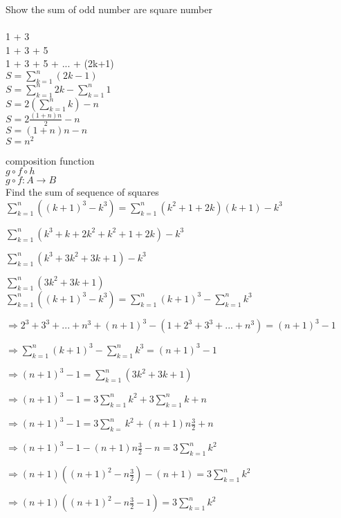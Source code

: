 \documentclass[10pt]{article}
\begin{document}
\begin{flushleft}
Show the sum of odd number are square number\\
\\
1 + 3\\
1 + 3 + 5 \\
1 + 3 + 5 + ... + (2k+1) \\
\medskip
$S = \sum_{k=1}^{n} (2k-1)$ \\
$S = \sum_{k=1}^{n} 2k - \sum_{k=1}^{n} 1$ \\
$S = 2(\sum_{k=1}^{n} k) - n $ \\
$S = 2 \frac{(1+n)n}{2} - n$ \\
$S = (1+n)n - n$ \\
$S = n^2 $ \\
\end{flushleft}
composition function \\
$g \circ f \circ h $ \\
$g \circ f \colon A\to B$ \\

Find the sum of sequence of squares\\

$\sum_{k=1}^{n}((k+1)^3 - k^3) = \sum_{k=1}^{n}(k^2+1+2k)(k+1) - k^3$

$\sum_{k=1}^{n} (k^3+k+2k^2+k^2+1+2k)-k^3$

$\sum_{k=1}^{n} (k^3+3k^2+3k+1)-k^3$

$\sum_{k=1}^{n} (3k^2+3k+1)$ \\

$\sum_{k=1}^{n} ((k+1)^3-k^3) = \sum_{k=1}^{n} (k+1)^3 - \sum_{k=1}^{n} k^3$

$\Rightarrow 2^3 + 3^3 + ... + n^3 + (n+1)^3 - (1 + 2^3 + 3^3 + ... + n^3) = (n+1)^3 -1$

$\Rightarrow  \sum_{k=1}^{n}(k+1)^3 - \sum_{k=1}^{n}k^3 =(n+1)^3 - 1$

$\Rightarrow (n+1)^3-1 = \sum_{k=1}^{n}(3k^2+3k+1) $

$\Rightarrow (n+1)^3-1 = 3\sum_{k=1}^{n} k^2 +  3\sum_{k=1}^{n} k + n $

$\Rightarrow (n+1)^3-1 = 3\sum_{k=}^{n} k^2 + (n+1) n \frac{3}{2} + n$

$\Rightarrow (n+1)^3-1 -  (n+1) n \frac{3}{2} - n= 3\sum_{k=1}^{n} k^2 $

$\Rightarrow (n+1)((n+1)^2-n \frac{3}{2})-(n+1) = 3\sum_{k=1}^{n} k^2$

$\Rightarrow (n+1)( (n+1)^2 -n\frac{3}{2}-1) = 3\sum_{k=1}^{n} k^2 $	
\end{document}

